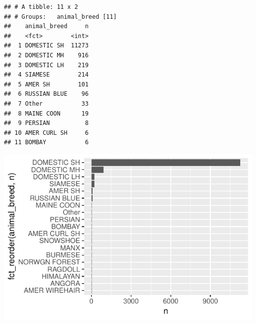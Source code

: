 \documentclass[]{article}
\newenvironment{Shaded}{\begin{snugshade}}{\end{snugshade}}
\newcommand{\KeywordTok}[1]{\textcolor[rgb]{0.13,0.29,0.53}{\textbf{#1}}}
\newcommand{\DataTypeTok}[1]{\textcolor[rgb]{0.13,0.29,0.53}{#1}}
\newcommand{\DecValTok}[1]{\textcolor[rgb]{0.00,0.00,0.81}{#1}}
\newcommand{\StringTok}[1]{\textcolor[rgb]{0.31,0.60,0.02}{#1}}
\newcommand{\OtherTok}[1]{\textcolor[rgb]{0.56,0.35,0.01}{#1}}
\newcommand{\OperatorTok}[1]{\textcolor[rgb]{0.81,0.36,0.00}{\textbf{#1}}}
\newcommand{\NormalTok}[1]{#1}
\begin{document}
\begin{verbatim}
## # A tibble: 11 x 2
## # Groups:   animal_breed [11]
##    animal_breed     n
##    <fct>        <int>
##  1 DOMESTIC SH  11273
##  2 DOMESTIC MH    916
##  3 DOMESTIC LH    219
##  4 SIAMESE        214
##  5 AMER SH        101
##  6 RUSSIAN BLUE    96
##  7 Other           33
##  8 MAINE COON      19
##  9 PERSIAN          8
## 10 AMER CURL SH     6
## 11 BOMBAY           6
\end{verbatim}

\begin{Shaded}
\end{Shaded}

\includegraphics{Stage_2_files/figure-latex/unnamed-chunk-4-1.pdf}
\end{document}
